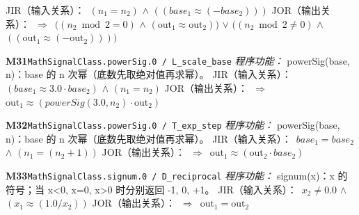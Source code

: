 \documentclass[11pt]{article}
\begin{document}
\hspace*{1.5em}JIR（输入关系）：\ $(n_{1} = n_{2})$ $\wedge$ $((base_{1} \approx  (-base_{2})))$\newline
\hspace*{1.5em}JOR（输出关系）：\ $\Rightarrow$\ $((n_{2} \bmod  2 = 0)$ $\wedge$ $(\mathrm{out}_{1} \approx  \mathrm{out}_{2}))$ $\vee$ $((n_{2} \bmod  2\neq 0)$ $\wedge$ $((\mathrm{out}_{1} \approx  (-\mathrm{out}_{2}))))$\par\medskip
\textbf{M31}\quad \texttt{MathSignalClass.powerSig.0 / L\_scale\_base}\newline
\hspace*{1.5em}\emph{程序功能：} powerSig(base, n)：\textbar{}base\textbar{} 的 n 次幂（底数先取绝对值再求幂）。\newline
\hspace*{1.5em}JIR（输入关系）：\ $(base_{1} \approx  3.0\cdot base_{2})$ $\wedge$ $(n_{1} = n_{2})$\newline
\hspace*{1.5em}JOR（输出关系）：\ $\Rightarrow$\ $\mathrm{out}_{1} \approx  (powerSig(3.0, n_{2})\cdot \mathrm{out}_{2})$\par\medskip
\textbf{M32}\quad \texttt{MathSignalClass.powerSig.0 / T\_exp\_step}\newline
\hspace*{1.5em}\emph{程序功能：} powerSig(base, n)：\textbar{}base\textbar{} 的 n 次幂（底数先取绝对值再求幂）。\newline
\hspace*{1.5em}JIR（输入关系）：\ $base_{1} = base_{2}$ $\wedge$ $(n_{1} = (n_{2} + 1))$\newline
\hspace*{1.5em}JOR（输出关系）：\ $\Rightarrow$\ $\mathrm{out}_{1} \approx  (\mathrm{out}_{2}\cdot base_{2})$\par\medskip
\textbf{M33}\quad \texttt{MathSignalClass.signum.0 / D\_reciprocal}\newline
\hspace*{1.5em}\emph{程序功能：} signum(x)：x 的符号；当 x\textless{}0, x=0, x\textgreater{}0 时分别返回 -1, 0, +1。\newline
\hspace*{1.5em}JIR（输入关系）：\ $x_{2}\neq 0.0$ $\wedge$ $(x_{1} \approx  (1.0 / x_{2}))$\newline
\hspace*{1.5em}JOR（输出关系）：\ $\Rightarrow$\ $\mathrm{out}_{1} = \mathrm{out}_{2}$\par\medskip
\end{document}
